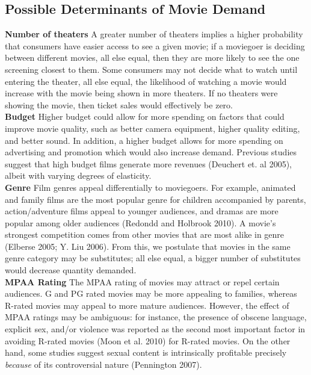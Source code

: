 \documentclass[11pt]{article} %
\begin{document}
\subsection{Possible Determinants of Movie Demand} 
\setlength\parindent{0pt}

\begin{adjustwidth}{1cm}{}

\textbf{Number of theaters} \newline
A greater number of theaters implies a higher probability that consumers have easier access to see a given movie; if a moviegoer is deciding between different movies, all else equal, then they are more likely to see the one screening closest to them. Some consumers may not decide what to watch until entering the theater, all else equal, the likelihood of watching a movie would increase with the movie being shown in more theaters. If no theaters were showing the movie, then ticket sales would effectively be zero. \\


\textbf{Budget}\newline
Higher budget could allow for more spending on factors that could improve movie quality, such as better camera equipment, higher quality editing, and better sound. In addition, a higher budget allows for more spending on advertising and promotion which would also increase demand. Previous studies suggest that high budget films generate more revenues (Deuchert et. al 2005), albeit with varying degrees of elasticity.  
\\

\textbf{Genre}\newline
Film genres appeal differentially to moviegoers. For example, animated and family films are the most popular genre for children accompanied by parents, action/adventure films appeal to younger audiences, and dramas are more popular among older audiences (Redondd and Holbrook 2010). A movie’s strongest competition comes from other movies that are most alike in genre (Elberse 2005; Y. Liu 2006). From this, we postulate that movies in the same genre category may be substitutes; all else equal, a bigger number of substitutes would decrease quantity demanded. 
 \\

\textbf{MPAA Rating}\newline
The MPAA rating of movies may attract or repel certain audiences. G and PG rated movies may be more appealing to families, whereas R-rated movies may appeal to more mature audiences. However, the effect of MPAA ratings may be ambiguous: for instance, the presence of obscene language, explicit sex, and/or violence was reported as the second most important factor in avoiding R-rated movies (Moon et al. 2010) for R-rated movies. On the other hand, some studies suggest sexual content is intrinsically profitable precisely \textit{because} of its controversial nature (Pennington 2007). \\


\end{adjustwidth}
\end{document}
